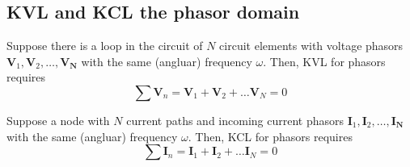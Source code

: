 \documentclass{article}
\begin{document}
\subsection{KVL and KCL the phasor domain}
\begin{proposition}
    Suppose there is a loop in the circuit of $N$ circuit elements with voltage phasors $\mathbf V_1,\mathbf V_2,\dots,\mathbf{V_N}$ with the same (angluar) frequency $\omega$. Then, KVL for phasors requires 
    \begin{equation}
        \sum\mathbf V_n=\mathbf V_1+\mathbf V_2+\dots \mathbf V_N=0
    \end{equation}
\end{proposition}
\begin{proposition}
    Suppose a node with $N$ current paths and incoming current phasors $\mathbf I_1,\mathbf I_2,\dots,\mathbf{I_N}$ with the same (angluar) frequency $\omega$. Then, KCL for phasors requires
    \begin{equation}
        \sum \mathbf I_n=\mathbf I_1+\mathbf I_2+\dots \mathbf I_N=0
    \end{equation}
\end{proposition}
\end{document}

